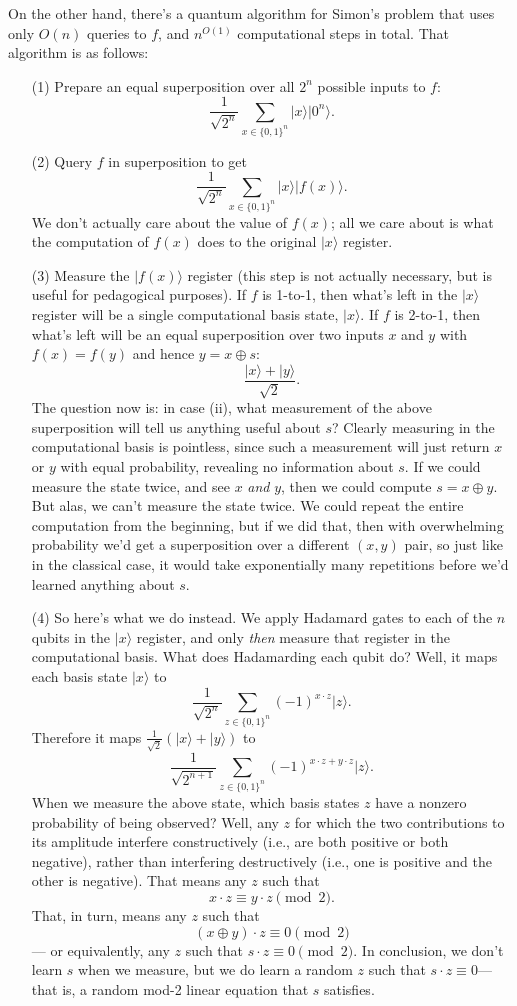 \documentclass[12pt]{report}
\theoremstyle{plain}
\theoremstyle{definition}
\renewcommand{\ket}[1]{|#1\rangle}
\begin{document}
On the other hand, there's a quantum algorithm for Simon's problem that uses only $O(n)$ queries to $f$, and $n^{O(1)}$ computational steps in total.
That algorithm is as follows:

\begin{enumerate}
\item[(1)] Prepare an equal superposition over all $2^n$ possible inputs to $f$:
$$\frac{1}{\sqrt{2^n}}\sum_{x \in \{0,1\}^n} \ket{x} \ket{0^n}.$$
\item[(2)] Query $f$ in superposition to get
$$\frac{1}{\sqrt{2^n}}\sum_{x \in \{0,1\}^n} \ket{x} \ket{f(x)}.$$
We don't actually care about the value of $f(x)$; all we care about is what the computation of $f(x)$ does to the original $\ket{x}$ register.
\item[(3)] Measure the $\ket{f(x)}$ register (this step is not actually necessary, but is useful for pedagogical purposes).
If $f$ is 1-to-1, then what's left in the $\ket{x}$ register will be a single computational basis state, $\ket{x}$. If $f$ is 2-to-1,
then what's left will be an equal superposition over two inputs $x$ and $y$ with $f(x)=f(y)$ and hence $y=x\oplus s$:
$$\frac{\ket{x}+\ket{y}}{\sqrt{2}}.$$
The question now is: in case (ii), what measurement of the above superposition will tell us anything useful about $s$? Clearly measuring
in the computational basis is pointless, since such a measurement will just return $x$ or $y$ with equal probability, revealing no information about $s$.
If we could measure the state twice, and see $x$ {\em and} $y$, then we could compute $s=x\oplus y$. But alas, we can't measure the state twice. We could repeat the entire computation from the beginning, but if we did that, then with overwhelming probability we'd get a superposition over a different $(x,y)$ pair, so
just like in the classical case, it would take exponentially many repetitions before we'd learned anything about $s$.
\item[(4)] So here's what we do instead. We apply Hadamard gates to each of the $n$ qubits in the $\ket{x}$ register, and only {\em then} measure that register in the computational basis. What does Hadamarding each qubit do? Well, it maps each basis state $\ket{x}$ to
    $$ \frac{1}{\sqrt{2^n}} \sum_{z\in \{0,1\}^n} (-1)^{x\cdot z}\ket{z}. $$
    Therefore it maps $\frac{1}{\sqrt{2}}(\ket{x}+\ket{y})$ to
    $$ \frac{1}{\sqrt{2^{n+1}}} \sum_{z\in \{0,1\}^n} (-1)^{x\cdot z + y\cdot z}\ket{z}. $$
    When we measure the above state, which basis states $z$ have a nonzero probability of being observed? Well, any $z$ for which the two contributions to its amplitude interfere constructively (i.e., are both positive or both negative), rather than interfering destructively (i.e., one is positive and the other is negative).  That means any $z$ such that $$x\cdot z \equiv y\cdot z \pmod 2.$$  That, in turn, means any $z$ such that $$(x\oplus y)\cdot z \equiv 0 \pmod 2$$ --- or equivalently, any $z$ such that $s\cdot z \equiv 0 \pmod 2$.  In conclusion, we don't learn $s$ when we measure, but we do learn a random $z$ such that $s\cdot z \equiv 0$---that is, a random mod-2 linear equation that $s$ satisfies.

\end{enumerate}
\end{document}
